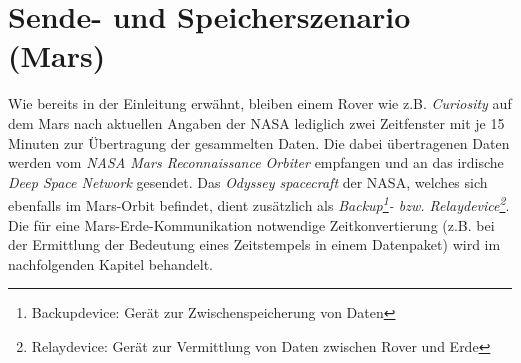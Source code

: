 \section{Sende- und Speicherszenario (Mars)}

Wie bereits in der Einleitung erw{\"a}hnt, bleiben einem Rover wie z.B.
\textit{Curiosity} auf dem Mars nach aktuellen Angaben der NASA \cite{web5}
lediglich zwei Zeitfenster mit je 15 Minuten zur {\"U}bertragung der gesammelten
Daten. Die dabei {\"u}bertragenen Daten werden vom \textit{NASA Mars
Reconnaissance Orbiter} empfangen und an das irdische \textit{Deep Space
Network} gesendet. Das \textit{Odyssey spacecraft} der NASA, welches
sich ebenfalls im Mars-Orbit befindet, dient zus{\"a}tzlich als
\textit{Backup\footnote{Backupdevice: Ger{\"a}t zur Zwischenspeicherung von
Daten}- bzw.
Relaydevice\footnote{Relaydevice: Ger{\"a}t zur Vermittlung von Daten zwischen
Rover und Erde}}. Die f{\"u}r eine Mars-Erde-Kommunikation notwendige
Zeitkonvertierung (z.B. bei der Ermittlung der Bedeutung eines Zeitstempels in
einem Datenpaket) wird im nachfolgenden Kapitel behandelt.
\label{Empfangsfenster}